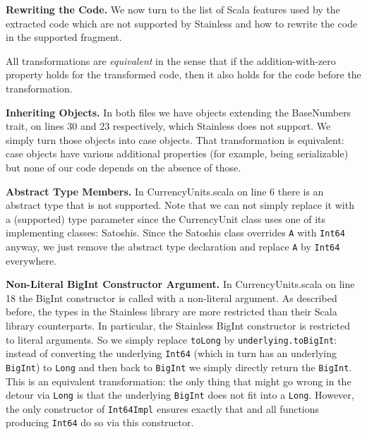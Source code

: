 \documentclass[hyphens, a4paper,USenglish,cleveref, autoref, thm-restate]{oasics-v2019}
\renewcommand{\paragraph}{\textbf}%
\begin{document}

\paragraph{Rewriting the Code.} We now turn to the list of Scala
features used by the extracted code which are not supported by
Stainless and how to rewrite the code in the supported fragment.

All transformations are \emph{equivalent} in the sense that if the
addition-with-zero property holds for the transformed code, then it
also holds for the code before the transformation.

\paragraph{Inheriting Objects.} In both files we have objects
extending the BaseNumbers trait, on lines 30 and 23 respectively,
which Stainless does not support. We simply turn those objects into
case objects. That transformation is equivalent: case objects have
various additional properties (for example, being serializable) but
none of our code depends on the absence of those.

\paragraph{Abstract Type Members.} In CurrencyUnits.scala on line 6
there is an abstract type that is not supported. Note that we can not
simply replace it with a (supported) type parameter since the
CurrencyUnit class uses one of its implementing classes:
Satoshis. Since the Satoshis class overrides \texttt{A} with \texttt{Int64} anyway, we
just remove the abstract type declaration and replace \texttt{A} by \texttt{Int64}
everywhere.

\paragraph{Non-Literal BigInt Constructor Argument.} In
CurrencyUnits.scala on line 18 the BigInt constructor is called with a
non-literal argument. As described before, the types in the Stainless
library are more restricted than their Scala library counterparts. In
particular, the Stainless BigInt constructor is restricted to literal
arguments. So we simply replace \texttt{toLong} by
\texttt{underlying.toBigInt}: instead of converting the underlying
\texttt{Int64} (which in turn has an underlying \texttt{BigInt}) to
\texttt{Long} and then back to \texttt{BigInt} we simply directly
return the \texttt{BigInt}. This is an equivalent transformation: the
only thing that might go wrong in the detour via \texttt{Long} is that
the underlying \texttt{BigInt} does not fit into a
\texttt{Long}. However, the only constructor of \texttt{Int64Impl}
ensures exactly that and all functions producing \texttt{Int64} do so
via this constructor.
\end{document}

